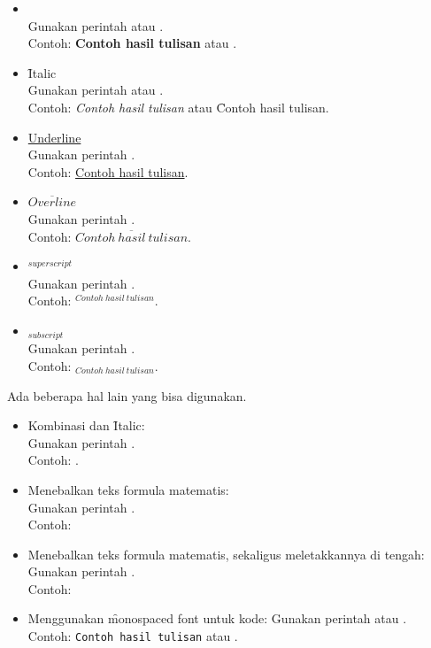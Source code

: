 \begin{itemize}
	\item {} \\
	Gunakan perintah  atau
	.\\
	Contoh: \textbf{Contoh hasil tulisan} atau .
	\item \f{Italic} \\
	Gunakan perintah  atau
	.\\
	Contoh: \textit{Contoh hasil tulisan} atau \f{Contoh hasil tulisan}.
	\item \underline{Underline} \\
	Gunakan perintah .\\
	Contoh: \underline{Contoh hasil tulisan}.
	\item $\overline{Overline}$ \\
	Gunakan perintah .\\
	Contoh: $\overline{Contoh~hasil~tulisan}$.
	\item $^{superscript}$ \\
	Gunakan perintah \code{\$\bslash{}$\lbrace\rbrace$\$}.\\
	Contoh: $^{Contoh~hasil~tulisan}$.
	\item $_{subscript}$ \\
	Gunakan perintah \code{\$\bslash{}\_$\lbrace\rbrace$\$}.\\
	Contoh: $_{Contoh~hasil~tulisan}$.
\end{itemize}

Ada beberapa hal lain yang bisa digunakan.
\begin{itemize}
	\item Kombinasi  dan \f{Italic}: \\
	Gunakan perintah . \\
	Contoh: .
	\item Menebalkan teks formula matematis: \\
	Gunakan perintah . \\
	Contoh: \m{\alpha~\beta}
	\item Menebalkan teks formula matematis, sekaligus meletakkannya di tengah: \\
	Gunakan perintah . \\
	Contoh: \mc{\alpha~\beta}
	\item Menggunakan \f{monospaced font} untuk kode:
	Gunakan perintah  atau . \\
	Contoh: \texttt{Contoh hasil tulisan} atau .
\end{itemize}

